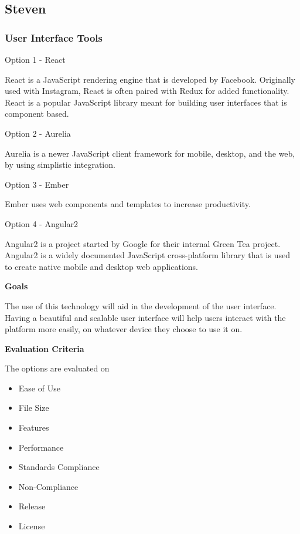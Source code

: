\documentclass[letterpaper, 10pt, draftclsnofoot, compsoc, onecolumn]{IEEEtran}
\begin{document}
\subsection{Steven}
\vspace{1pc}

{\subsubsection{User Interface Tools}
{\noindent Option 1 - React \cite{React} \par}
{\noindent React is a JavaScript rendering engine that is developed by Facebook. Originally used with Instagram, React is often paired with Redux for added functionality. React is a popular JavaScript library meant for building user interfaces that is component based. \par}

\medskip
{\noindent Option 2 - Aurelia \cite{Aurelia} \par}
{\noindent Aurelia is a newer JavaScript client framework for mobile, desktop, and the web, by using simplistic integration.  \par}

\medskip
{\noindent Option 3 - Ember \cite{Ember} \par}
{\noindent Ember uses web components and templates to increase productivity.  \par}

\medskip
{\noindent Option 4 - Angular2 \cite{Angular2} \par}
{\noindent Angular2 is a project started by Google for their internal Green Tea project. Angular2 is a widely documented JavaScript cross-platform library that is used to create native mobile and desktop web applications. \par}

\medskip
{\noindent\rmfamily\bfseries\color{black} Goals \par}
{\noindent The use of this technology will aid in the development of the user interface. Having a beautiful and scalable user interface will help users interact with the platform more easily, on whatever device they choose to use it on. \par}

\medskip
\newpage
{\noindent\rmfamily\bfseries\color{black} Evaluation Criteria \par}
{\noindent The options are evaluated on 

\begin{itemize}
\item Ease of Use
\item File Size
\item Features
\item Performance
\item Standards Compliance
\item Non-Compliance
\item Release 
\item License
\end{itemize}

}}
\end{document}
